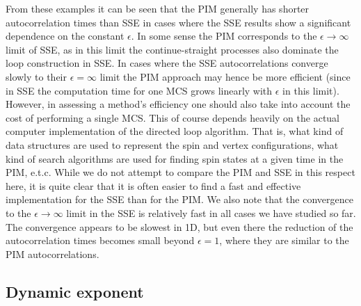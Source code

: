 \documentclass[10pt,pre,aps,twocolumn,showpacs,superscriptaddress,
floatfix]{revtex4}
\begin{document}
From these examples it can be seen that the PIM generally has shorter 
autocorrelation times than SSE in cases where the SSE results show a
significant dependence on the constant $\epsilon$. In some sense the PIM 
corresponds to the $\epsilon \to \infty$ limit of SSE, as in this limit 
the continue-straight processes also dominate the loop construction
in SSE. In cases where the SSE autocorrelations converge slowly to their 
$\epsilon=\infty$ limit the PIM approach may hence be more efficient (since
in SSE the computation time for one MCS grows linearly with $\epsilon$ in
this limit). However, in assessing a method's efficiency one should also 
take into account the cost of performing a single MCS. This of course depends 
heavily on the actual computer implementation of the directed loop 
algorithm. That is, what kind of data structures are used to represent the 
spin and vertex configurations, what kind of search algorithms are used for 
finding spin states at a given time in the PIM, e.t.c. While we do not attempt
to compare the PIM and SSE in this respect here, it is quite clear that it 
is often easier to find a fast and effective implementation for the SSE than 
for the PIM. We also note that the convergence to the $\epsilon\to \infty$
limit in the SSE is relatively fast in all cases we have studied so far. 
The convergence appears to be slowest in 1D, but even there the reduction 
of the autocorrelation times becomes small beyond $\epsilon=1$, where
they are similar to the PIM autocorrelations.

\subsection{Dynamic exponent}
\end{document}
